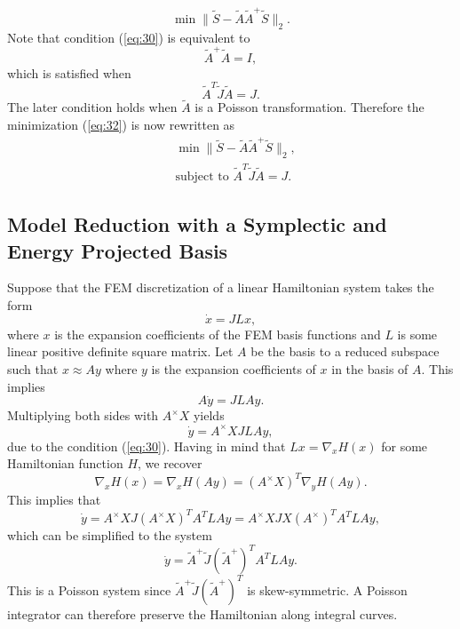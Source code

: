 \documentclass[12pt]{article}
\begin{document}
\begin{equation} \label{eq:34}
	\min \| \tilde S - \tilde A {\tilde A}^+ \tilde S \|_2.
\end{equation}
Note that condition (\ref{eq:30}) is equivalent to
\begin{equation} \label{eq:35}
	{\tilde A}^+ \tilde A = I,
\end{equation}
which is satisfied when
\begin{equation} \label{eq:36}
	\tilde A ^T \tilde J \tilde A = J.
\end{equation}
The later condition holds when $\tilde A$ is a Poisson transformation. Therefore the minimization (\ref{eq:32}) is now rewritten as
\begin{equation}
\begin{aligned}
	& \min \| \tilde S - \tilde A {\tilde A}^+ \tilde S \|_2, \\
	&\text{subject to } \tilde A ^T \tilde J \tilde A = J.
\end{aligned}
\end{equation}

\subsection{Model Reduction with a Symplectic and Energy Projected Basis}
Suppose that the FEM discretization of a linear Hamiltonian system takes the form
\begin{equation}
	\dot x = J L x,
\end{equation}
where $x$ is the expansion coefficients of the FEM basis functions and $L$ is some linear positive definite square 
 matrix. Let $A$ be the basis to a reduced subspace such that $x \approx Ay$ where $y$ is the expansion coefficients of $x$ in the basis of $A$. This implies
\begin{equation}
	A \dot y = J L A y.
\end{equation}
Multiplying both sides with $A^\times X$ yields
\begin{equation}
	\dot y = A^\times X J L A y,
\end{equation}
due to the condition (\ref{eq:30}). Having in mind that $L x = \nabla_x H(x)$ for some Hamiltonian function $H$, we recover
\begin{equation}
	\nabla_x H(x) = \nabla_x H(Ay) = ( A^\times X )^T \nabla_y H(Ay).
\end{equation}
This implies that
\begin{equation}
	\dot y = A^\times X J (A^\times X)^T A^T L A y = A^\times X J X (A^\times)^T A^T L A y,
\end{equation}
which can be simplified to the system
\begin{equation} \label{eq:reduced-poisson}
	\dot y = \tilde A ^+ \tilde J (\tilde A ^+)^T  A^T L A y.
\end{equation}
This is a Poisson system since $\tilde A ^+ \tilde J (\tilde A ^+)^T$ is skew-symmetric. A Poisson integrator can therefore preserve the Hamiltonian along integral curves.
\end{document}
